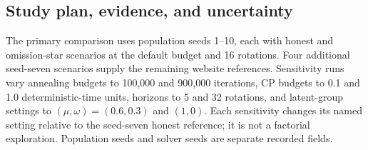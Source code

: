\documentclass[11pt,a4paper]{article}
\theoremstyle{definition}\newtheorem{definition}[theorem]{Definition}
\theoremstyle{remark}\newtheorem{remark}[theorem]{Remark}
\begin{document}
\subsection{Study plan, evidence, and uncertainty}
The primary comparison uses population seeds 1--10, each with honest and omission-star scenarios at the default budget and 16 rotations. Four additional seed-seven scenarios supply the remaining website references. Sensitivity runs vary annealing budgets to 100,000 and 900,000 iterations, CP budgets to 0.1 and 1.0 deterministic-time units, horizons to 5 and 32 rotations, and latent-group settings to $(\mu,\omega)=(0.6,0.3)$ and $(1,0)$. Each sensitivity changes its named setting relative to the seed-seven honest reference; it is not a factorial exploration. Population seeds and solver seeds are separate recorded fields.
\end{document}
